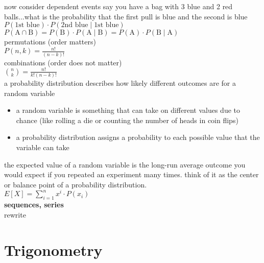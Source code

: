 \documentclass{article}
\begin{document}
now consider dependent events say you have a bag with 3 blue and 2 red balls...what is the probability that the first pull is blue and the second is blue\\
$P(\text{1st blue}) \cdot P(\text{2nd blue} \mid \text{1st blue})$\\

$P(\text{A} \cap \text{B}) = P(\text{B}) \cdot P(\text{A} \mid \text{B}) = P(\text{A}) \cdot P(\text{B} \mid \text{A})$\\

permutations (order matters)\\
$P(n, k) = \frac{n!}{(n - k)!}$\\

combinations (order does not matter)\\
$\binom{n}{k} = \frac{n!}{k!(n - k)!}$\\

a probability distribution describes how likely different outcomes are for a random variable
	\begin{itemize}
		\item a random variable is something that can take on different values due to chance (like rolling a die or counting the number of heads in coin flips)
		\item a probability distribution assigns a probability to each possible value that the variable can take
	\end{itemize}

the expected value of a random variable is the long-run average outcome you would expect if you repeated an experiment many times. think of it as the center or balance point of a probability distribution.\\

$E[X] = \sum_{i=1}^{n} x^i \cdot P(x_i)$\\

\textbf{sequences, series}\\
rewrite\\


\newpage
\section*{Trigonometry}
\end{document}
